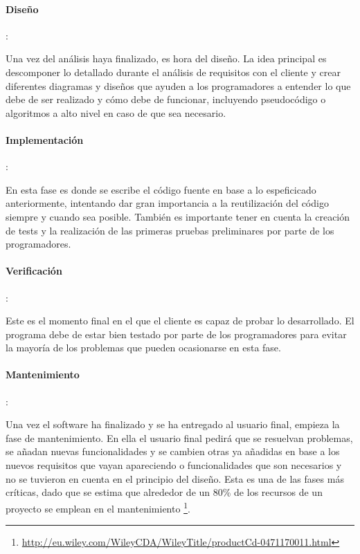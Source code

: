 \paragraph{Diseño}: 

Una vez del análisis haya finalizado, es hora del diseño. La idea principal es descomponer lo detallado durante el análisis de requisitos con el cliente y crear diferentes diagramas y diseños que ayuden a los programadores a entender lo que debe de ser realizado y cómo debe de funcionar, incluyendo pseudocódigo o algoritmos a alto nivel en caso de que sea necesario.

\paragraph{Implementación}:

En esta fase es donde se escribe el código fuente en base a lo espeficicado anteriormente, intentando dar gran importancia a la reutilización del código siempre y cuando sea posible. También es importante tener en cuenta la creación de tests y la realización de las primeras pruebas preliminares por parte de los programadores.

\paragraph{Verificación}:

Este es el momento final en el que el cliente es capaz de probar lo desarrollado. El programa debe de estar bien testado por parte de los programadores para evitar la mayoría de los problemas que pueden ocasionarse en esta fase.

\paragraph{Mantenimiento}:

Una vez el software ha finalizado y se ha entregado al usuario final, empieza la fase de mantenimiento. En ella el usuario final pedirá que se resuelvan problemas, se añadan nuevas funcionalidades y se cambien otras ya añadidas en base a los nuevos requisitos que vayan apareciendo o funcionalidades que son necesarios y no se tuvieron en cuenta en el principio del diseño. Esta es una de las fases más críticas, dado que se estima que alrededor de un 80\% de los recursos de un proyecto se emplean en el mantenimiento \footnote{\url{http://eu.wiley.com/WileyCDA/WileyTitle/productCd-0471170011.html}}.

